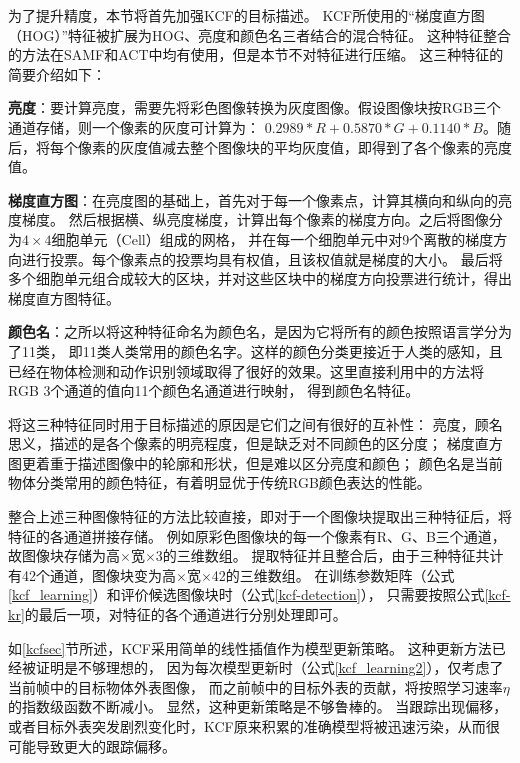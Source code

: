 为了提升精度，本节将首先加强KCF的目标描述。
KCF所使用的``梯度直方图（HOG）''特征被扩展为HOG、亮度和颜色名三者结合的混合特征。
这种特征整合的方法在SAMF和ACT中均有使用，但是本节不对特征进行压缩。
这三种特征的简要介绍如下：
\begin{compactitem}
\item{\textbf{亮度}：要计算亮度，需要先将彩色图像转换为灰度图像。假设图像块按RGB三个通道存储，则一个像素的灰度可计算为：
$0.2989 * R + 0.5870 * G + 0.1140 * B$。随后，将每个像素的灰度值减去整个图像块的平均灰度值，即得到了各个像素的亮度值。}
\item{\textbf{梯度直方图}：在亮度图的基础上，首先对于每一个像素点，计算其横向和纵向的亮度梯度。
然后根据横、纵亮度梯度，计算出每个像素的梯度方向。之后将图像分为$4\times4$细胞单元（Cell）组成的网格，
并在每一个细胞单元中对9个离散的梯度方向进行投票。每个像素点的投票均具有权值，且该权值就是梯度的大小。
最后将多个细胞单元组合成较大的区块，并对这些区块中的梯度方向投票进行统计，得出梯度直方图特征。}
\item{\textbf{颜色名}：之所以将这种特征命名为颜色名，是因为它将所有的颜色按照语言学分为了11类，
即11类人类常用的颜色名字。这样的颜色分类更接近于人类的感知，且已经在物体检测和动作识别领域取得了很好的效果。这里直接利用\cite{colornaming}中的方法将RGB 3个通道的值向11个颜色名通道进行映射，
得到颜色名特征。}
\end{compactitem}
将这三种特征同时用于目标描述的原因是它们之间有很好的互补性：
亮度，顾名思义，描述的是各个像素的明亮程度，但是缺乏对不同颜色的区分度；
梯度直方图更着重于描述图像中的轮廓和形状，但是难以区分亮度和颜色；
颜色名是当前物体分类常用的颜色特征，有着明显优于传统RGB颜色表达的性能。

整合上述三种图像特征的方法比较直接，即对于一个图像块提取出三种特征后，将特征的各通道拼接存储。
例如原彩色图像块的每一个像素有R、G、B三个通道，故图像块存储为高$\times$宽$\times$3的三维数组。
提取特征并且整合后，由于三种特征共计有42个通道，图像块变为高$\times$宽$\times$42的三维数组。
在训练参数矩阵（公式\ref{kcf_learning}）和评价候选图像块时（公式\ref{kcf-detection}），
只需要按照公式\ref{kcf-kr}的最后一项，对特征的各个通道进行分别处理即可。

如\ref{kcfsec}节所述，KCF采用简单的线性插值作为模型更新策略。
这种更新方法已经被证明是不够理想的，
因为每次模型更新时（公式\ref{kcf_learning2}），仅考虑了当前帧中的目标物体外表图像，
而之前帧中的目标外表的贡献，将按照学习速率$\eta$的指数级函数不断减小。
显然，这种更新策略是不够鲁棒的。
当跟踪出现偏移，或者目标外表突发剧烈变化时，KCF原来积累的准确模型将被迅速污染，从而很可能导致更大的跟踪偏移。

